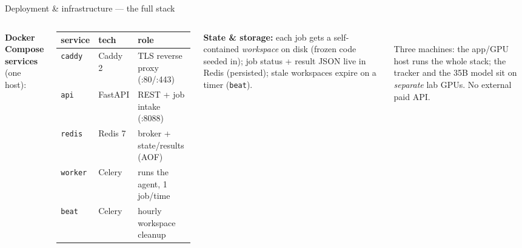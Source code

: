 \documentclass[aspectratio=169,10pt]{beamer}
\begin{document}
\begin{frame}{Deployment \& infrastructure --- the full stack}
\small
\begin{columns}[T]
{\footnotesize \textbf{Docker Compose services} (one host):}\\[3pt]
{\scriptsize
\renewcommand{\arraystretch}{1.15}
\begin{tabular}{@{}lll@{}}
\toprule
service & tech & role\\
\midrule
\texttt{caddy} & Caddy 2 & TLS reverse proxy (:80/:443)\\
\texttt{api} & FastAPI & REST + job intake (:8088)\\
\texttt{redis} & Redis 7 & broker + state/results (AOF)\\
\texttt{worker} & Celery & runs the agent, 1 job/time\\
\texttt{beat} & Celery & hourly workspace cleanup\\
\bottomrule
\end{tabular}}\par\vspace{6pt}
{\scriptsize \textbf{State \& storage:} each job gets a self-contained \emph{workspace} on disk (frozen code seeded in); job status + result JSON live in Redis (persisted); stale workspaces expire on a timer (\texttt{beat}).}
\centering
{}\\[4pt]
{\scriptsize Three machines: the app/GPU host runs the whole stack; the tracker and the 35B model sit on \emph{separate} lab GPUs. No external paid API.}
\end{columns}
\end{frame}
\end{document}
